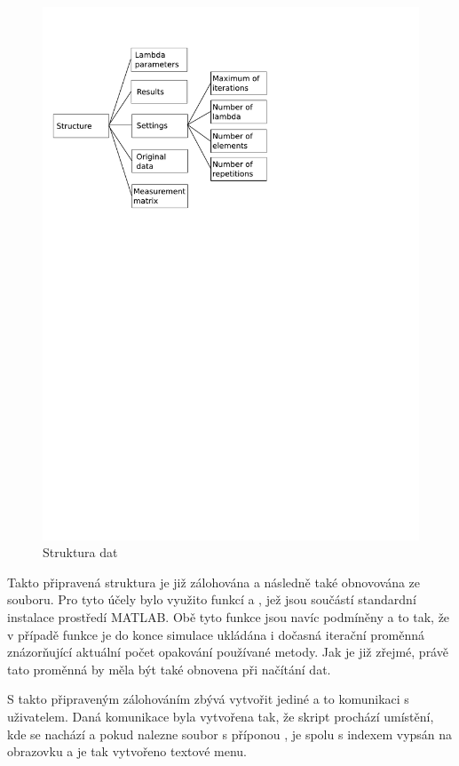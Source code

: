\documentclass[FM,BP]{tulthesis}
\begin{document}
\begin{figure}[!ht]
	\begin{center}
		\includegraphics[scale=0.7]{obr/structure.pdf}
	\end{center}
	\caption{Struktura dat}
	\label{fig:struktura}
\end{figure}

Takto připravená struktura je již zálohována a následně také obnovována ze souboru. Pro tyto účely bylo využito funkcí  a , jež jsou součástí standardní instalace prostředí MATLAB. Obě tyto funkce jsou navíc podmíněny a to tak, že v případě funkce  je do konce simulace ukládána i dočasná iterační proměnná znázorňující aktuální počet opakování používané metody. Jak je již zřejmé, právě tato proměnná by měla být také obnovena při načítání dat. 

S takto připraveným zálohováním zbývá vytvořit jediné a to komunikaci s uživatelem. Daná komunikace byla vytvořena tak, že skript prochází umístění, kde se nachází a pokud nalezne soubor s příponou , je spolu s indexem vypsán na obrazovku a je tak vytvořeno textové menu. 
\end{document}
